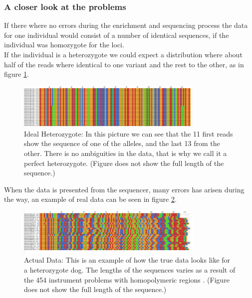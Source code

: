 \subsubsection{A closer look at the problems}

If there where no errors during the enrichment and sequencing process the data for one individual would consist of a number of identical sequences, if the individual was homozygote for the loci.\\
If the individual is a heterozygote we could expect a distribution where about half of the reads where identical to one variant and the rest to the other, as in figure \ref{fig:perfect_heterozygote}.

\begin{figure}[ht]
	\centering
		\includegraphics[width=0.8\textwidth]{../pictures/../pictures/perfect_heterozygote.png}
	\caption{Ideal Heterozygote: In this picture we can see that the 11 first reads show the sequence of one of the alleles, and the last 13 from the other. There is no ambiguities in the data, that is why we call it a perfect heterozygote. (Figure does not show the full length of the sequence.)}
	\label{fig:perfect_heterozygote}
\end{figure}

When the data is presented from the sequencer, many errors has arisen during the way, an example of real data can be seen in figure \ref{fig:align_chaos}.

\begin{figure}[ht]
	\centering
		\includegraphics[width=0.8\textwidth]{../pictures/align_chaos_cropped.png}
	\caption{Actual Data: This is an example of how the true data looks like for a heterozygote dog. The lengths of the sequences varies as a result of the 454 instrument problems with homopolymeric regions \cite{454_problems}. (Figure does not show the full length of the sequence.)}
	\label{fig:align_chaos}
\end{figure}

